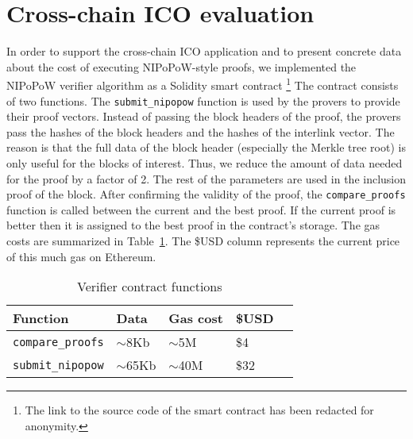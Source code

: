 \section{Cross-chain ICO evaluation}
In order to support the cross-chain ICO application and to present concrete data
about the cost of executing NIPoPoW-style proofs, we implemented the NIPoPoW
verifier algorithm as a Solidity smart contract
\footnote{
The link to the source code of the smart contract has been redacted for anonymity.
}
The contract consists of two functions.
The \texttt{submit\_nipopow} function is used by the provers to provide their
proof vectors. Instead of passing the block headers of the proof, the provers
pass the hashes of the block headers and the hashes of the interlink vector. The
reason is that the full data of the block header (especially the Merkle tree
root) is only useful for the blocks of interest. Thus, we reduce the amount of
data needed for the proof by a factor of 2. The rest of the parameters are used
in the inclusion proof of the block. After confirming the validity of the proof,
the \texttt{compare\_proofs} function is called between the current and the best
proof. If the current proof is better then it is assigned to the best proof in
the contract's storage.
The gas costs are summarized in
Table~\ref{tbl:gascosts}. The \$USD column represents the current price of this
much gas on Ethereum.

\begin{table}[ht]
  \centering
  \caption{Verifier contract functions}
  \label{tbl:gascosts}
  \begin{tabular}{l|l|l|ll}
    \hline
    Function & Data & Gas cost & \$USD \\ \hline
    \texttt{compare\_proofs} & $\sim$8Kb & $\sim$5M & \$4 \\ \hline
    \texttt{submit\_nipopow} & $\sim$65Kb & $\sim$40M & \$32 \\ \hline
  \end{tabular}
\end{table}

